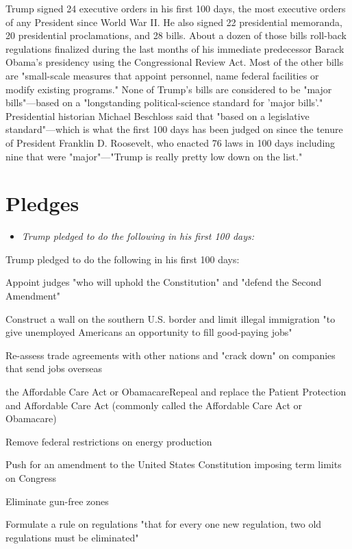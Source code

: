 Trump signed 24 executive orders in his first 100 days, the most
executive orders of any President since World War II. He also signed 22
presidential memoranda, 20 presidential proclamations, and 28 bills.
About a dozen of those bills roll-back regulations finalized during the
last months of his immediate predecessor Barack Obama's presidency using
the Congressional Review Act. Most of the other bills are "small-scale
measures that appoint personnel, name federal facilities or modify
existing programs." None of Trump's bills are considered to be "major
bills"---based on a "longstanding political-science standard for 'major
bills'." Presidential historian Michael Beschloss said that "based on a
legislative standard"---which is what the first 100 days has been judged
on since the tenure of President Franklin D. Roosevelt, who enacted 76
laws in 100 days including nine that were "major"---"Trump is really
pretty low down on the list."

\section{Pledges}\label{pledges}

\begin{itemize}
\item
  \emph{Trump pledged to do the following in his first 100 days:}
\end{itemize}

Trump pledged to do the following in his first 100 days:

Appoint judges "who will uphold the Constitution" and "defend the Second
Amendment"

Construct a wall on the southern U.S. border and limit illegal
immigration "to give unemployed Americans an opportunity to fill
good-paying jobs"

Re-assess trade agreements with other nations and "crack down" on
companies that send jobs overseas

the Affordable Care Act or ObamacareRepeal and replace the Patient
Protection and Affordable Care Act (commonly called the Affordable Care
Act or Obamacare)

Remove federal restrictions on energy production

Push for an amendment to the United States Constitution imposing term
limits on Congress

Eliminate gun-free zones

Formulate a rule on regulations "that for every one new regulation, two
old regulations must be eliminated"

